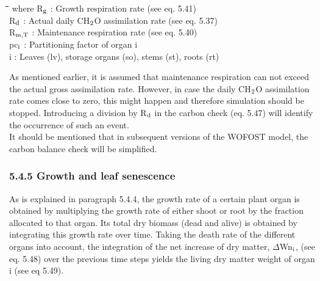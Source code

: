 \documentclass[11pt]{article}
\begin{document}
\nwln
\begin{tabbing}
\hspace{1.27cm}\=\hspace{1.27cm}\=\hspace{1.27cm}\=\hspace{1.27cm}\=%
\hspace{1.27cm}\=\hspace{1.27cm}\=\hspace{1.27cm}\=\hspace{1.27cm}\=%
\hspace{1.27cm}\=\hspace{1.27cm}\=\kill
where\> R$_{{\rm g}}$\> : Growth respiration rate (see eq. 5.41)\> \> \> \> \> \> \> \> [kg ha$^{{\rm -1}}$ d$^{{\rm -1}}$]\\
\>R$_{{\rm d}}$\> : Actual daily CH$_{{\rm 2}}$O assimilation rate (see eq. 5.37)\> \> \> \> \> \> \> \> [kg ha$^{{\rm -1}}$ d$^{{\rm -1}}$]\\
\>R$_{{\rm m,T}}$\> : Maintenance respiration rate (see eq. 5.40)\> \> \> \> \> \> \> \> [kg ha$^{{\rm -1}}$ d$^{{\rm -1}}$]\\
\>pc$_{{\rm i}}$\> : Partitioning factor of organ i\> \> \> \> \> \> \> \> [kg kg$^{{\rm -1}}$]\\
\>i\> : Leaves (lv), storage organs (so), stems (st), roots (rt)
\end{tabbing}

As mentioned earlier, it is assumed that maintenance respiration can not exceed the actual
gross assimilation rate. However, in case the daily CH$_{{\rm 2}}$O assimilation rate comes close to
zero, this might happen and therefore simulation should be stopped. Introducing a
division by R$_{{\rm d}}$ in the carbon check (eq. 5.47) will identify the occur\-rence of such an
event.\\
It should be mentioned that in subsequent versions of the WOFOST model, the carbon
balance check will be simplified.

\bigskip
\bigskip

\subsubsection{  5.4.5 Growth and leaf senescence  }

As is explained in paragraph 5.4.4, the growth rate of a certain plant organ is obtained by
multi\-plying the growth rate of either shoot or root by the fraction allocated to that organ.
Its total dry biomass (dead and alive) is obtained by integrating this growth rate over
time. Taking the death rate of the different organs into account, the integration of the net
increase of dry matter, $\Delta$Wn$_{{\rm i}}$, (see eq. 5.48) over the previous time steps yields the living
dry matter weight of organ i (see eq 5.49).
\end{document}
